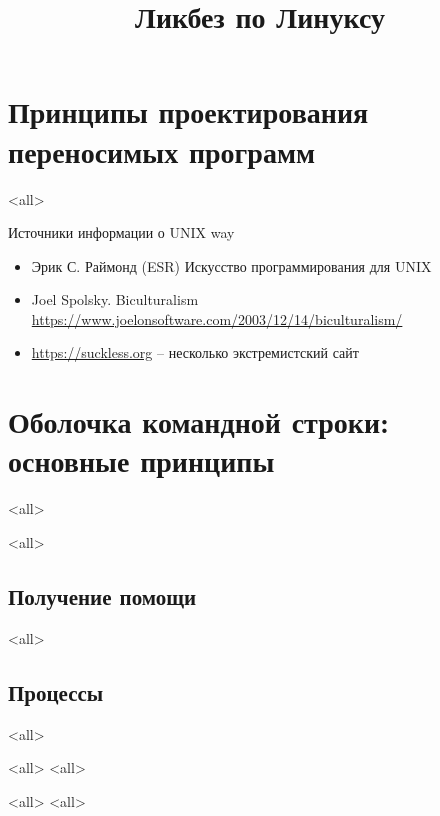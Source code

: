 

\title{Ликбез по Линуксу}



\begin{frame}
  \frametitle{}
  \titlepage
\end{frame}

\section{Принципы проектирования переносимых программ}
\mode<all>{}

\begin{frame}{Источники информации о UNIX way}
  \begin{itemize}
    \item Эрик С. Раймонд (ESR) Искусство программирования для UNIX
    \item Joel Spolsky. Biculturalism \url{https://www.joelonsoftware.com/2003/12/14/biculturalism/}
    \item \url{https://suckless.org} -- несколько экстремистский сайт
  \end{itemize}
\end{frame}

\section{Оболочка командной строки: основные принципы}

\mode<all>{}

\mode<all>{}

\subsection{Получение помощи}

\mode<all>{}

\subsection{Процессы}

\mode<all>{}

\mode<all>{}
\mode<all>{}

\mode<all>{}
\mode<all>{}





